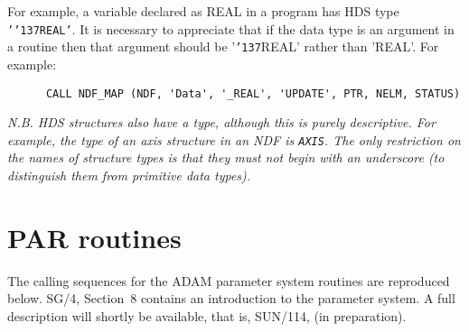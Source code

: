 \documentclass[twoside,11pt]{article}
\renewcommand{\_}{{\tt\char'137}}
\newcommand{\xref}[3]{#1}
\newcommand{\xlabel}[1]{}
\begin{document}
For example, a variable declared as REAL in a program has HDS type 
{\tt '\_REAL'}.
It is necessary to appreciate that if the data type is 
an argument in a 
routine then that  argument should be '\_REAL' rather than 'REAL'.
For example:
\begin{verbatim}
      CALL NDF_MAP (NDF, 'Data', '_REAL', 'UPDATE', PTR, NELM, STATUS)
\end{verbatim}

{\sl N.B. HDS structures also have a type, although this is purely descriptive.
For example, the type of an axis  structure in an NDF is {\tt AXIS}.
The only restriction on the names of structure types is that they 
must not begin with an underscore (to distinguish them from 
primitive data types).}

\newpage
\section{PAR routines\label{apxpar}\xlabel{par_routines}}

The calling sequences for the ADAM  parameter system routines are
reproduced below. \xref{SG/4}{sg4}{}, Section~8  contains an introduction to
the parameter system.
A full description will shortly be available, that is,
\xref{SUN/114}{sun114}{}, (in preparation).
\end{document}
